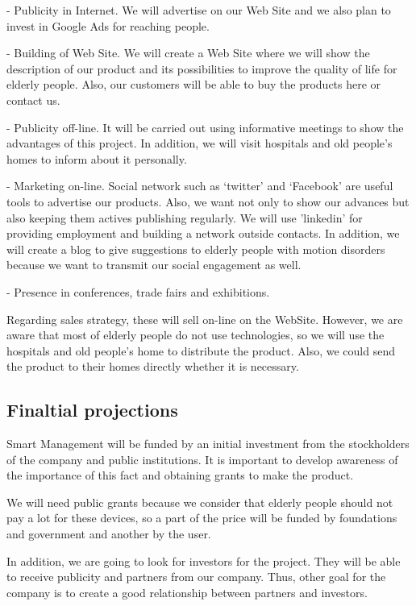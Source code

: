 -	Publicity in Internet. We will advertise on our Web Site and we also plan to invest in Google Ads for reaching people.

-	Building of Web Site. We will create a Web Site where we will show the description of our product and its possibilities to improve the quality of life for elderly people. Also, our customers will be able to buy the products here or contact us.

-	Publicity off-line. It will be carried out using informative meetings to show the advantages of this project. In addition, we will visit hospitals and old people's homes to inform about it personally.

-	Marketing on-line. Social network such as ‘twitter’ and ‘Facebook’ are useful tools to advertise our products. Also, we want not only to show our advances but also keeping them actives publishing regularly.
We will use ’linkedin’ for providing employment and building a network outside contacts.
In addition, we will create a blog to give suggestions to elderly people with motion disorders because we want to transmit our social engagement as well.

-	Presence in conferences, trade fairs and exhibitions.

Regarding sales strategy, these will sell on-line on the WebSite. However, we are aware that most of elderly people do not use technologies, so we will use the hospitals and old people’s home to distribute the product. Also, we could send the product to their homes directly whether it is necessary.


\subsection{Finaltial projections}
Smart Management will be funded by an initial investment from the stockholders of the company and public institutions. It is important to develop awareness of the importance of this fact and obtaining grants to make the product.

We will need public grants because we consider that elderly people should not pay a lot for these devices, so a part of the price will be funded by foundations and government and another by the user.

In addition, we are going to look for investors for the project. They will be able to receive publicity and partners from our company. Thus, other goal for the company is to create a good relationship between partners and investors.

